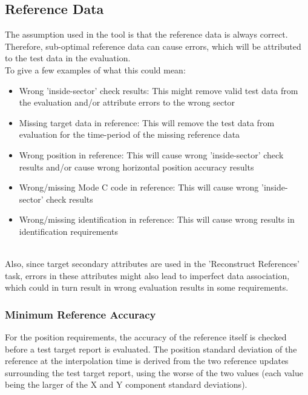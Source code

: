 \subsection{Reference Data}

The assumption used in the tool is that the reference data is always correct. Therefore, sub-optimal reference data can cause errors, which will be attributed to the test data in the evaluation. \\

To give a few examples of what this could mean:
\begin{itemize}  
\item Wrong 'inside-sector' check results: This might remove valid test data from the evaluation and/or attribute errors to the wrong sector
\item Missing target data in reference: This will remove the test data from evaluation for the time-period of the missing reference data
\item Wrong position in reference: This will cause wrong 'inside-sector' check results and/or cause wrong horizontal position accuracy results
\item Wrong/missing Mode C code in reference: This will cause wrong 'inside-sector' check results
\item Wrong/missing identification in reference: This will cause wrong results in identification requirements
\end{itemize}
\ \\

Also, since target secondary attributes are used in the 'Reconstruct References' task, errors in these attributes might also lead to imperfect data association, which could in turn result in wrong evaluation results in some requirements.

\subsubsection{Minimum Reference Accuracy}
\label{sec:eval_min_ref_acc}

For the position requirements, the accuracy of the reference itself is checked before a test target report is evaluated. The position standard deviation of the reference at the interpolation time is derived from the two reference updates surrounding the test target report, using the worse of the two values (each value being the larger of the X and Y component standard deviations). \\

